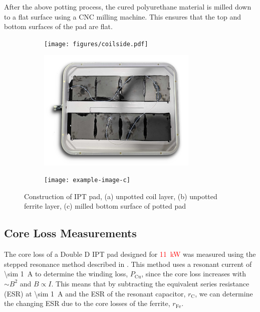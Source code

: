 \documentclass[conference]{IEEEtran}
\begin{document}
After the above potting process, the cured polyurethane material is milled down to a flat surface using a CNC milling machine. 
This ensures that the top and bottom surfaces of the pad are flat. 

\begin{figure}
  \centering
  \begin{subfigure}{\columnwidth}
    \centering
    \texttt{[image: figures/coilside.pdf]}
    \caption{}
    \label{fig:coilside}
  \end{subfigure}
  \vspace{1em}

  \begin{subfigure}{\columnwidth}
    \centering
    \includegraphics[width=3in]{figures/ferriteside.pdf}
    \caption{}
    \label{fig:ferriteside}
  \end{subfigure}
  \vspace{1em}

  \begin{subfigure}{\columnwidth}
    \centering
    \texttt{[image: example-image-c]}
    \caption{}
    \label{fig:finalpad}
  \end{subfigure}

  \caption{Construction of IPT pad, (a) unpotted coil layer, (b) unpotted ferrite layer, (c) milled bottom surface of potted pad}
  \label{fig:padconstruction}
\end{figure}

\subsection{Core Loss Measurements}

The core loss of a Double D IPT pad designed for \textcolor{red}{\SI{11}{\kilo\watt}} was measured using the stepped resonance method described in \cite{kalraPowerLossMeasurement2020}.
This method uses a resonant current of \SI{\sim 1}{\ampere} to determine the winding loss, $P_\text{Cu}$, since the core loss increases with $\sim B^2$ and $B \propto I$.
This means that by subtracting the equivalent series resistance (ESR) at \SI{\sim 1}{\ampere} and the ESR of the resonant capacitor, $r_\text{C}$, we can determine the changing ESR due to the core losses of the ferrite, $r_\text{Fe}$. 
\end{document}
